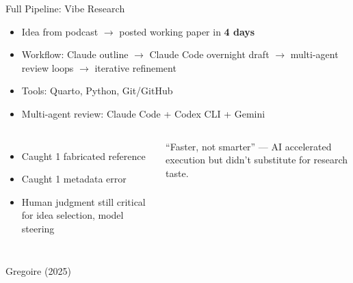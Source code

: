 \documentclass[aspectratio=169, 11pt]{beamer}
\newcommand{\emphgold}[1]{\alert{\textbf{#1}}}
\newcommand{\sourceref}[1]{\vspace{0.15cm}\hfill{\tiny\textcolor{medgray}{#1}}}
\begin{document}
\begin{frame}[shrink=6]{Full Pipeline: Vibe Research}
\begin{keyinsight}
\begin{itemize}
  \item Idea from podcast $\rightarrow$ posted working paper in \emphgold{4 days}
  \item Workflow: Claude outline $\rightarrow$ Claude Code overnight draft $\rightarrow$ multi-agent review loops $\rightarrow$ iterative refinement
  \item Tools: Quarto, Python, Git/GitHub
  \item Multi-agent review: Claude Code + Codex CLI + Gemini
\end{itemize}
\end{keyinsight}
\vspace{0.3cm}
\begin{columns}[T]
\begin{itemize}
  \item Caught 1 fabricated reference
  \item Caught 1 metadata error
  \item Human judgment still critical for idea selection, model steering
\end{itemize}

\begin{bigquote}
\small
``Faster, not smarter'' --- AI accelerated execution but didn't substitute for research taste.
\end{bigquote}
\end{columns}
\sourceref{Gregoire (2025)}
\end{frame}
\end{document}
